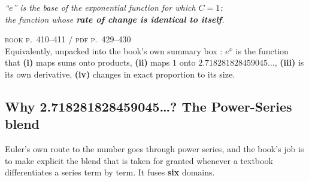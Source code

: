 \begin{keybox}[title={The concept of $e$, stated before any number is computed}]
\begin{center}\large
\textit{``$e$'' is the base of the exponential function for which $C=1$:\\[4pt]
the function whose \textbf{rate of change is identical to itself}.}
\end{center}
\vspace{-2pt}
\hfill{\footnotesize\color{slate}\textsc{book p.~410--411 / pdf p.~429--430}}\\[4pt]
Equivalently, unpacked into the book's own summary box : $e^{x}$ is the function that
\;\textbf{(i)} maps sums onto products, \;\textbf{(ii)} maps $1$ onto $2.718281828459045\ldots$,
\;\textbf{(iii)} is its own derivative, \;\textbf{(iv)} changes in exact proportion to its size.
\end{keybox}

\clearpage
\subsection{Why 2.718281828459045\ldots? The Power-Series blend}

Euler's own route to the number goes through power series, and the book's job is to make explicit the
blend that is taken for granted whenever a textbook differentiates a series term by term. It fuses
\textbf{six} domains.

